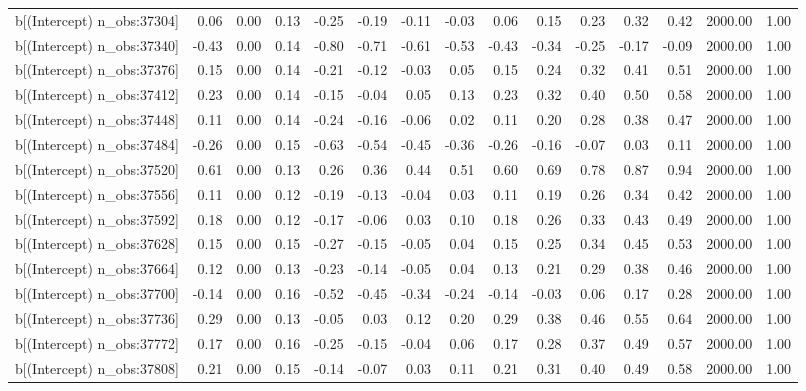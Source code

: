 \begin{table}[ht]
\begin{tabular}{rrrrrrrrrrrrrrr}
  b[(Intercept) n\_obs:37304] & 0.06 & 0.00 & 0.13 & -0.25 & -0.19 & -0.11 & -0.03 & 0.06 & 0.15 & 0.23 & 0.32 & 0.42 & 2000.00 & 1.00 \\ 
  b[(Intercept) n\_obs:37340] & -0.43 & 0.00 & 0.14 & -0.80 & -0.71 & -0.61 & -0.53 & -0.43 & -0.34 & -0.25 & -0.17 & -0.09 & 2000.00 & 1.00 \\ 
  b[(Intercept) n\_obs:37376] & 0.15 & 0.00 & 0.14 & -0.21 & -0.12 & -0.03 & 0.05 & 0.15 & 0.24 & 0.32 & 0.41 & 0.51 & 2000.00 & 1.00 \\ 
  b[(Intercept) n\_obs:37412] & 0.23 & 0.00 & 0.14 & -0.15 & -0.04 & 0.05 & 0.13 & 0.23 & 0.32 & 0.40 & 0.50 & 0.58 & 2000.00 & 1.00 \\ 
  b[(Intercept) n\_obs:37448] & 0.11 & 0.00 & 0.14 & -0.24 & -0.16 & -0.06 & 0.02 & 0.11 & 0.20 & 0.28 & 0.38 & 0.47 & 2000.00 & 1.00 \\ 
  b[(Intercept) n\_obs:37484] & -0.26 & 0.00 & 0.15 & -0.63 & -0.54 & -0.45 & -0.36 & -0.26 & -0.16 & -0.07 & 0.03 & 0.11 & 2000.00 & 1.00 \\ 
  b[(Intercept) n\_obs:37520] & 0.61 & 0.00 & 0.13 & 0.26 & 0.36 & 0.44 & 0.51 & 0.60 & 0.69 & 0.78 & 0.87 & 0.94 & 2000.00 & 1.00 \\ 
  b[(Intercept) n\_obs:37556] & 0.11 & 0.00 & 0.12 & -0.19 & -0.13 & -0.04 & 0.03 & 0.11 & 0.19 & 0.26 & 0.34 & 0.42 & 2000.00 & 1.00 \\ 
  b[(Intercept) n\_obs:37592] & 0.18 & 0.00 & 0.12 & -0.17 & -0.06 & 0.03 & 0.10 & 0.18 & 0.26 & 0.33 & 0.43 & 0.49 & 2000.00 & 1.00 \\ 
  b[(Intercept) n\_obs:37628] & 0.15 & 0.00 & 0.15 & -0.27 & -0.15 & -0.05 & 0.04 & 0.15 & 0.25 & 0.34 & 0.45 & 0.53 & 2000.00 & 1.00 \\ 
  b[(Intercept) n\_obs:37664] & 0.12 & 0.00 & 0.13 & -0.23 & -0.14 & -0.05 & 0.04 & 0.13 & 0.21 & 0.29 & 0.38 & 0.46 & 2000.00 & 1.00 \\ 
  b[(Intercept) n\_obs:37700] & -0.14 & 0.00 & 0.16 & -0.52 & -0.45 & -0.34 & -0.24 & -0.14 & -0.03 & 0.06 & 0.17 & 0.28 & 2000.00 & 1.00 \\ 
  b[(Intercept) n\_obs:37736] & 0.29 & 0.00 & 0.13 & -0.05 & 0.03 & 0.12 & 0.20 & 0.29 & 0.38 & 0.46 & 0.55 & 0.64 & 2000.00 & 1.00 \\ 
  b[(Intercept) n\_obs:37772] & 0.17 & 0.00 & 0.16 & -0.25 & -0.15 & -0.04 & 0.06 & 0.17 & 0.28 & 0.37 & 0.49 & 0.57 & 2000.00 & 1.00 \\ 
  b[(Intercept) n\_obs:37808] & 0.21 & 0.00 & 0.15 & -0.14 & -0.07 & 0.03 & 0.11 & 0.21 & 0.31 & 0.40 & 0.49 & 0.58 & 2000.00 & 1.00 \\ 

\end{tabular}
\end{table}
